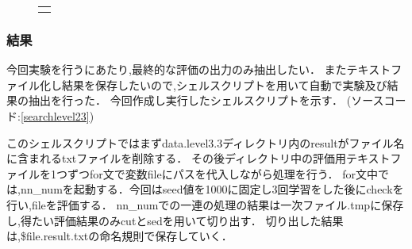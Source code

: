 \begin{figure}[H]
    \begin{center}
        \begin{tabular}{c}

            \begin{minipage}{0.33\hsize}
                \begin{center}
                
                \end{center}
                \end{minipage}

                \begin{minipage}{0.33\hsize}
                    \begin{center}
                        
                    \end{center}
                    \end{minipage}
                \begin{minipage}{0.33\hsize}
                    \begin{center}
                        
                    \end{center}
                    \end{minipage}
        \end{tabular}
\end{center}
\end{figure}

\subsubsection{結果}
今回実験を行うにあたり,最終的な評価の出力のみ抽出したい．
またテキストファイル化し結果を保存したいので,シェルスクリプトを用いて自動で実験及び結果の抽出を行った．
今回作成し実行したシェルスクリプトを示す． (ソースコード:\ref{searchlevel23})



このシェルスクリプトではまずdata.level3.3ディレクトリ内のresultがファイル名に含まれるtxtファイルを削除する．
その後ディレクトリ中の評価用テキストファイルを1つずつfor文で変数fileにパスを代入しながら処理を行う．
for文中では,nn\_numを起動する．今回はseed値を1000に固定し3回学習をした後にcheckを行い,fileを評価する．
nn\_numでの一連の処理の結果は一次ファイル.tmpに保存し,得たい評価結果のみcutとsedを用いて切り出す．
切り出した結果は,\${file}.result.txtの命名規則で保存していく．

